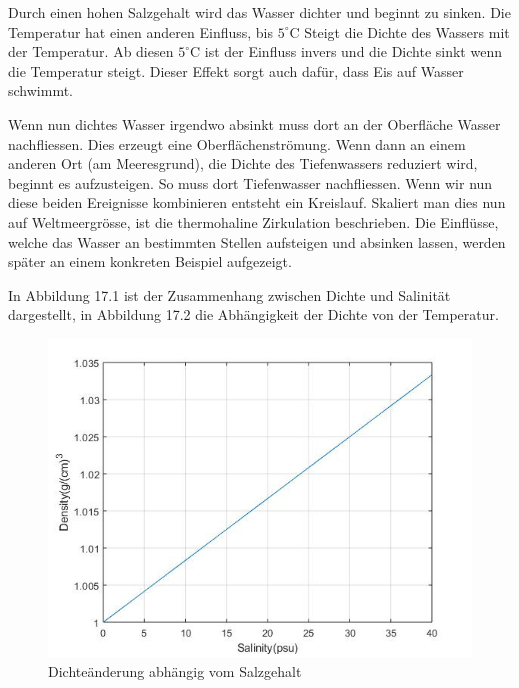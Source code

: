 Durch einen hohen Salzgehalt wird das Wasser dichter und beginnt zu sinken. Die Temperatur hat einen anderen Einfluss, bis $5^\circ\text{C}$ Steigt die Dichte des Wassers mit der Temperatur. Ab diesen $5^\circ\text{C}$ ist der Einfluss invers und die Dichte sinkt wenn die Temperatur steigt. Dieser Effekt sorgt auch dafür, dass Eis auf Wasser schwimmt.

Wenn nun dichtes Wasser irgendwo absinkt muss dort an der Oberfläche Wasser nachfliessen. Dies erzeugt eine Oberflächenströmung. Wenn dann an einem anderen Ort (am Meeresgrund), die Dichte des Tiefenwassers reduziert wird, beginnt es aufzusteigen. So muss dort Tiefenwasser nachfliessen. Wenn wir nun diese beiden Ereignisse kombinieren entsteht ein Kreislauf. Skaliert man dies nun auf Weltmeergrösse, ist die thermohaline Zirkulation beschrieben. Die Einflüsse, welche das Wasser an bestimmten Stellen aufsteigen und absinken lassen, werden später an einem konkreten Beispiel aufgezeigt.

In Abbildung 17.1 ist der Zusammenhang zwischen Dichte und Salinität dargestellt, in Abbildung 17.2 die Abhängigkeit der Dichte von der Temperatur.


\begin{figure}
	\centering
\includegraphics[width=12cm]{thermohalin/Code/graphs/graph_salinity.jpg}
\caption{Dichteänderung abhängig vom Salzgehalt}
\end{figure}

